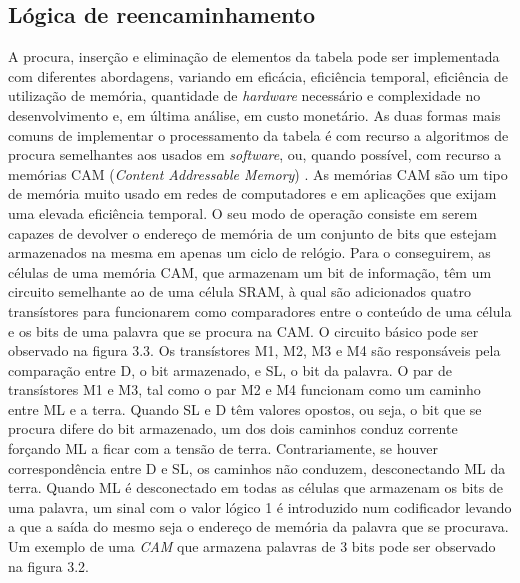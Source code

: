 \subsection{Lógica de reencaminhamento}
A procura, inserção e eliminação de elementos da tabela pode ser implementada com diferentes abordagens, variando em eficácia, eficiência temporal, eficiência de utilização de memória, quantidade de \textit{hardware} necessário e complexidade no desenvolvimento e, em última análise, em custo monetário. As duas formas mais comuns de implementar o processamento da tabela é com recurso a algoritmos de procura semelhantes aos usados em \textit{software}, ou, quando possível, com recurso a memórias CAM (\textit{Content Addressable Memory}) \cite{CAM}. As memórias CAM são um tipo de memória muito usado em redes de computadores e em aplicações que exijam uma elevada eficiência temporal. O seu modo de operação consiste em serem capazes de devolver o endereço de memória de um conjunto de bits que estejam armazenados na mesma em apenas um ciclo de relógio. Para o conseguirem, as células de uma memória CAM, que armazenam um bit de informação, têm um circuito semelhante ao de uma célula SRAM, à qual são adicionados quatro transístores para funcionarem como comparadores entre o conteúdo de uma célula e os bits de uma palavra que se procura na CAM. O circuito básico pode ser observado na figura 3.3. Os transístores M1, M2, M3 e M4 são responsáveis pela comparação entre D, o bit armazenado, e SL, o bit da palavra. O par de transístores M1 e M3, tal como o par M2 e M4 funcionam como um caminho entre ML e a terra. Quando SL e D têm valores opostos, ou seja, o bit que se procura difere do bit armazenado, um dos dois caminhos conduz corrente forçando ML a ficar com a tensão de terra. Contrariamente, se houver correspondência entre D e SL, os caminhos não conduzem, desconectando ML da terra.  Quando ML é desconectado em todas as células que armazenam os bits de uma palavra, um sinal com o valor lógico 1 é introduzido num codificador levando a que a saída do mesmo seja o endereço de memória da palavra que se procurava. Um exemplo de uma \textit{CAM} que armazena palavras de 3 bits pode ser observado na figura 3.2.

